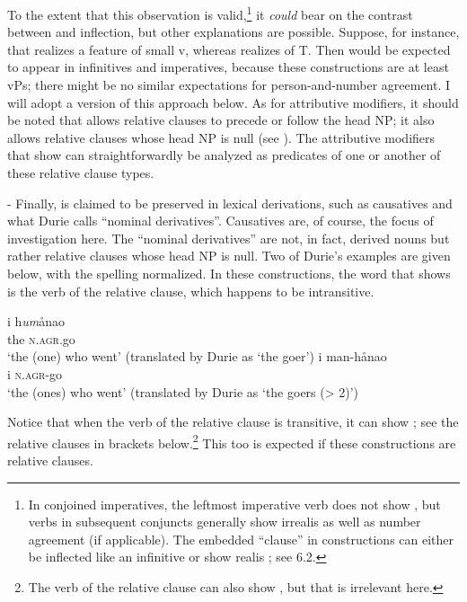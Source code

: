 \documentclass[output=paper,
modfonts
]{LSP/langsci}
\begin{document}
\begin{exe}
\begin{xlist}
To the extent that this observation is valid,\footnote{In conjoined
  imperatives, the leftmost imperative verb does not show
  , but verbs in subsequent conjuncts
  generally show irrealis  as well as number
  agreement (if applicable). The embedded ``clause'' in 
  constructions can either be inflected like an infinitive or show
  realis ; see 6.2.} it \emph{could} bear on
the contrast between  and inflection, but other explanations
are possible. Suppose, for instance, that  realizes a
feature of small v, whereas  realizes
 of T. Then  would be expected to appear in
infinitives and imperatives, because these constructions are at least
vPs; there might be no similar expectations for person-and-number
agreement. I will adopt a version of this approach below. As for
attributive modifiers, it should be noted that  allows relative
clauses to precede or follow the head NP; it also allows relative
clauses whose head NP is null (see \citealt{borja2015}). The
attributive modifiers that show  can straightforwardly
be analyzed as predicates of one or another of these relative clause
types.

- Finally,  is claimed to be preserved in lexical
derivations, such as causatives and what Durie calls ``nominal
derivatives''. Causatives are, of course, the focus of investigation
here. The ``nominal derivatives'' are not, in fact, derived nouns but
rather relative clauses whose head NP is null. Two of Durie's examples
are given below, with the spelling normalized. In these constructions,
the word that shows  is the verb of the relative clause,
which happens to be intransitive.

\ea \label{ex:chung:19}
	\ea \label{ex:chung:19a}\gll  i h\emph{um}ånao \\
		the \textsc{n.agr.}go\\
		\glt `the (one) who went' (translated by Durie as `the goer')
	\ex \label{ex:chung:19b}\gll i man-hånao\\
		i \textsc{n.agr-}go\\
		\glt `the (ones) who went' (translated by Durie as `the goers (\textgreater{}
		2)')
	\z
\z

Notice that when the verb of the relative clause is transitive, it can show
; see the relative clauses in brackets
below.\footnote{The verb of the relative clause can also show
  , but that is irrelevant here.} This too is expected if
these constructions are relative clauses.


\end{xlist}
\end{exe}
\end{document}
